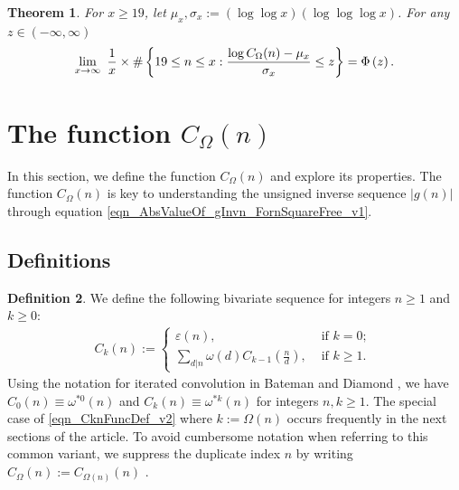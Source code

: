 \documentclass[11pt,reqno,a4letter]{article}
\numberwithin{equation}{section}
\numberwithin{figure}{section}
\numberwithin{table}{section}
\newcommand{\seqnum}[1]{\href{http://oeis.org/#1}{\color{ProcessBlue}{\underline{#1}}}}
\theoremstyle{plain}
\newtheorem{theorem}{Theorem}
\numberwithin{theorem}{section}
\theoremstyle{definition}
\newtheorem{definition}[theorem]{Definition}
\theoremstyle{remark}
\begin{document}
\begin{theorem}
\label{conj_DetFormOfEKTypeThmForCOmegan_v1} 
For $x \geq 19$, let $\mu_x, \sigma_x := (\log\log x)(\log\log\log x)$.
For any $z \in (-\infty, \infty)$ 
\begin{equation} 
\notag
\lim_{x \rightarrow \infty} \ \frac{1}{x} \times 
	\#\left\{19 \leq n \leq x: \frac{\log C_{\Omega}(n) - \mu_x}{\sigma_x} \leq z\right\} = 
     \Phi\left(z\right). 
\end{equation}
\end{theorem} 

\section{The function $C_{\Omega}(n)$} 
\label{Section_NewFormulasForgInvn_v1} 

In this section, we define the function 
$C_{\Omega}(n)$ and explore its properties. 
The function $C_{\Omega}(n)$ is key to understanding the 
unsigned inverse sequence $|g(n)|$ through equation 
\eqref{eqn_AbsValueOf_gInvn_FornSquareFree_v1}. 

\subsection{Definitions}

\begin{definition}
We define the following bivariate sequence for integers $n \geq 1$ and $k \geq 0$: 
\begin{align} 
\label{eqn_CknFuncDef_v2} 
C_k(n) := \begin{cases} 
     \varepsilon(n), & \text{ if $k = 0$; } \\ 
     \sum\limits_{d|n} \omega(d) C_{k-1}\left(\frac{n}{d}\right), & \text{ if $k \geq 1$. } 
     \end{cases} 
\end{align} 
Using the notation for iterated convolution in 
Bateman and Diamond \cite[Def.~2.3; \S 2]{ANT-BATEMAN-DIAMOND}, we have 
$C_0(n) \equiv \omega^{\ast 0}(n)$ and $C_k(n) \equiv \omega^{\ast k}(n)$ for 
integers $n, k \geq 1$. 
The special case of \eqref{eqn_CknFuncDef_v2} where 
$k := \Omega(n)$ occurs frequently in the next sections of the 
article. To avoid cumbersome notation when referring to this common variant, we suppress the 
duplicate index $n$ by writing $C_{\Omega}(n) := C_{\Omega(n)}(n)$ \cite[\seqnum{A008480}]{OEIS}. 
\end{definition}
\end{document}

